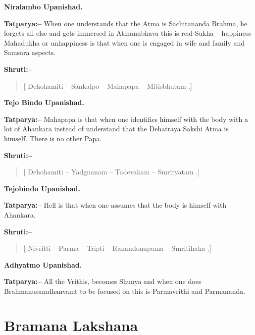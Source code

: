 \begin{flushright}
\textbf{Niralambo Upanishad.}
\end{flushright}

\textbf{Tatparya:–} When one understands that the Atma is Sachitananda Brahma, he forgets all else and gets immersed in Atmanubhava this is real Sukha – happiness Mahadukha or unhappiness is that when one is engaged in wife and family and Samsara aspects.

\textbf{Shruti:–}

\begin{verse}
[ Dehohamiti – Sankalpo – Mahapapa – Mitisbhutam .]
\end{verse}

\begin{flushright}
\textbf{Tejo Bindo Upanishad.}
\end{flushright}

\textbf{Tatparya:–} Mahapapa is that when one identifies himself with the body with a lot of Ahankara instead of understand that the Dehatraya Sakshi Atma is himself. There is no other Papa.

\textbf{Shruti:–}

\begin{verse}
[ Dehohamiti – Yadgnanam – Tadevakam – Smrityatam .]
\end{verse}

\begin{flushright}
\textbf{Tejobindo Upanishad.}
\end{flushright}

\textbf{Tatparya:–} Hell is that when one assumes that the body is himself with Ahankara.

\textbf{Shruti:–}

\begin{verse}
[ Nivritti – Parma – Tripti – Ranandonupama – Smritihaha .]
\end{verse}

\begin{flushright}
\textbf{Adhyatmo Upanishad.}
\end{flushright}

\textbf{Tatparya:–} All the Vrithis, becomes Shunya and when one does Brahmanusamdhanvamt to be focused on this is Parmavrithi and Parmananda.

\chapter{Bramana Lakshana}

